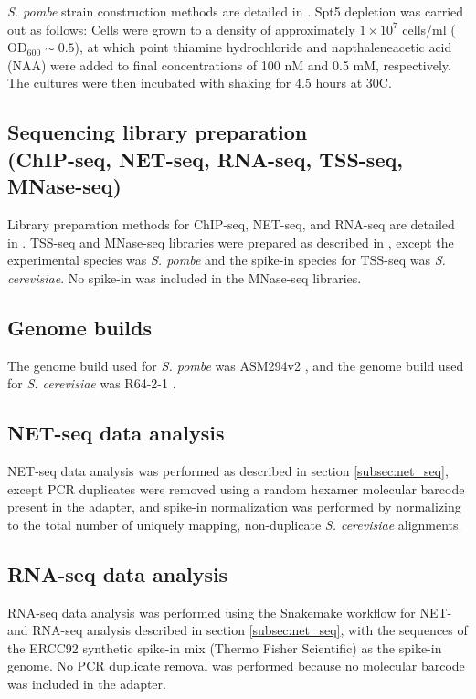 \textit{S. pombe} strain construction methods are detailed in \citet{shetty2017}.
Spt5 depletion was carried out as follows: Cells were grown to a density of approximately $1 \times 10^7$ cells/ml ($\text{OD}_{600} \sim 0.5$), at which point thiamine hydrochloride and napthaleneacetic acid (NAA) were added to final concentrations of 100 nM and 0.5 mM, respectively.
The cultures were then incubated with shaking for 4.5 hours at 30\textdegree C.

\subsection{Sequencing library preparation\\(ChIP-seq, NET-seq, RNA-seq, TSS-seq, MNase-seq)}

Library preparation methods for ChIP-seq, NET-seq, and RNA-seq are detailed in \citet{shetty2017}.
TSS-seq and MNase-seq libraries were prepared as described in \citet{doris2018}, except the experimental species was \textit{S. pombe} and the spike-in species for TSS-seq was \textit{S. cerevisiae}.
No spike-in was included in the MNase-seq libraries.

\subsection{Genome builds}

The genome build used for \textit{S. pombe} was ASM294v2 \citep{wood2002}, and the genome build used for \textit{S. cerevisiae} was R64-2-1 \citep{engel2014}.

\subsection{NET-seq data analysis}

NET-seq data analysis was performed as described in section \ref{subsec:net_seq}, except PCR duplicates were removed using a random hexamer molecular barcode present in the adapter, and spike-in normalization was performed by normalizing to the total number of uniquely mapping, non-duplicate \textit{S. cerevisiae} alignments.

\subsection{RNA-seq data analysis}

RNA-seq data analysis was performed using the Snakemake workflow for NET- and RNA-seq analysis described in section \ref{subsec:net_seq}, with the sequences of the ERCC92 synthetic spike-in mix (Thermo Fisher Scientific) as the spike-in genome.
No PCR duplicate removal was performed because no molecular barcode was included in the adapter.

